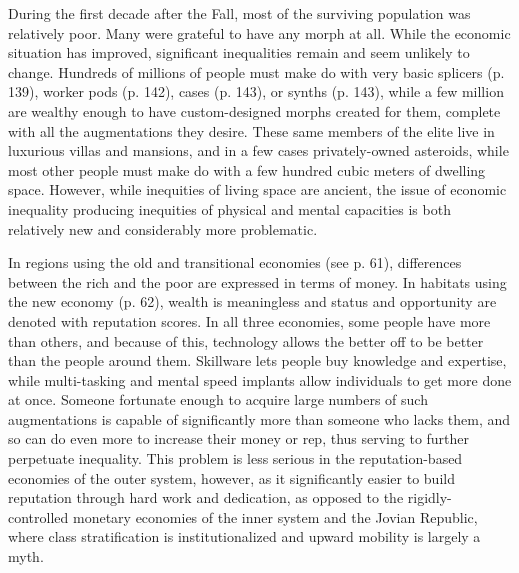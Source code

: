 During the first decade after the Fall, most of the surviving
population was relatively poor. Many were grateful to have any morph
at all. While the economic situation has improved, significant
inequalities remain and seem unlikely to change. Hundreds of millions
of people must make do with very basic splicers (p.  139), worker pods
(p. 142), cases (p. 143), or synths (p. 143), while a few million are
wealthy enough to have custom-designed morphs created for them,
complete with all the augmentations they desire. These same members of
the elite live in luxurious villas and mansions, and in a few cases
privately-owned asteroids, while most other people must make do with a
few hundred cubic meters of dwelling space. However, while inequities
of living space are ancient, the issue of economic inequality
producing inequities of physical and mental capacities is both
relatively new and considerably more problematic.

In regions using the old and transitional economies (see p. 61),
differences between the rich and the poor are expressed in terms of
money. In habitats using the new economy (p. 62), wealth is
meaningless and status and opportunity are denoted with reputation
scores. In all three economies, some people have more than others, and
because of this, technology allows the better off to be better than
the people around them. Skillware lets people buy knowledge and
expertise, while multi-tasking and mental speed implants allow
individuals to get more done at once. Someone fortunate enough to
acquire large numbers of such augmentations is capable of
significantly more than someone who lacks them, and so can do even
more to increase their money or rep, thus serving to further
perpetuate inequality. This problem is less serious in the
reputation-based economies of the outer system, however, as it
significantly easier to build reputation through hard work and
dedication, as opposed to the rigidly-controlled monetary economies of
the inner system and the Jovian Republic, where class stratification
is institutionalized and upward mobility is largely a myth.

